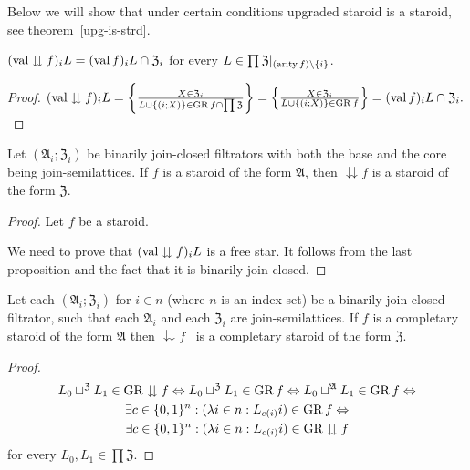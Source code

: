 Below we will show that under certain conditions upgraded staroid
is a staroid, see theorem~\ref{upg-is-strd}.
\begin{prop}
$(\operatorname{val}\downdownarrows f)_{i}L=(\operatorname{val} f)_{i}L\cap\mathfrak{Z}_{i}$
for every $L\in\prod\mathfrak{Z}|_{(\operatorname{arity} f)\setminus\{i\}}$.\end{prop}
\begin{proof}
$(\operatorname{val}\downdownarrows f)_{i}L=\left\{ \frac{X\in\mathfrak{Z}_{i}}{L\cup\{(i;X)\}\in\operatorname{GR} f\cap\prod\mathfrak{Z}}\right\}=\left\{ \frac{X\in\mathfrak{Z}_{i}}{L\cup\{(i;X)\}\in\operatorname{GR} f}\right\}=(\operatorname{val} f)_{i}L\cap\mathfrak{Z}_{i}.$\end{proof}
\begin{prop}
\label{down-staroid}Let $(\mathfrak{A}_{i};\mathfrak{Z}_{i})$ be
binarily join-closed filtrators with both the base and the core being
join-semilattices. If $f$ is a staroid of the form $\mathfrak{A}$,
then $\downdownarrows f$ is a staroid of the form $\mathfrak{Z}$.\end{prop}
\begin{proof}
Let $f$ be a staroid.

We need to prove that $(\operatorname{val}\downdownarrows f)_{i}L$ is a free star.
It follows from the last proposition and the fact that it is binarily
join-closed.\end{proof}
\begin{prop}
Let each $(\mathfrak{A}_{i};\mathfrak{Z}_{i})$ for $i\in n$ (where
$n$ is an index set) be a binarily join-closed filtrator, such that
each $\mathfrak{A}_{i}$ and each $\mathfrak{Z}_{i}$ are join-semilattices.
If $f$ is a completary staroid of the form $\mathfrak{A}$ then $\downdownarrows f$
\ is a completary staroid of the form $\mathfrak{Z}$.\end{prop}
\begin{proof}
~
\begin{multline*}
L_{0}\sqcup^{\mathfrak{Z}}L_{1}\in\operatorname{GR}\downdownarrows f\Leftrightarrow L_{0}\sqcup^{\mathfrak{Z}}L_{1}\in\operatorname{GR} f\Leftrightarrow L_{0}\sqcup^{\mathfrak{A}}L_{1}\in\operatorname{GR} f\Leftrightarrow\\
\exists c\in\{0,1\}^{n}:(\lambda i\in n:L_{c(i)}i)\in\operatorname{GR} f\Leftrightarrow\\
\exists c\in\{0,1\}^{n}:(\lambda i\in n:L_{c(i)}i)\in\operatorname{GR}\downdownarrows f
\end{multline*}
 for every $L_{0},L_{1}\in\prod\mathfrak{Z}$.
\end{proof}

